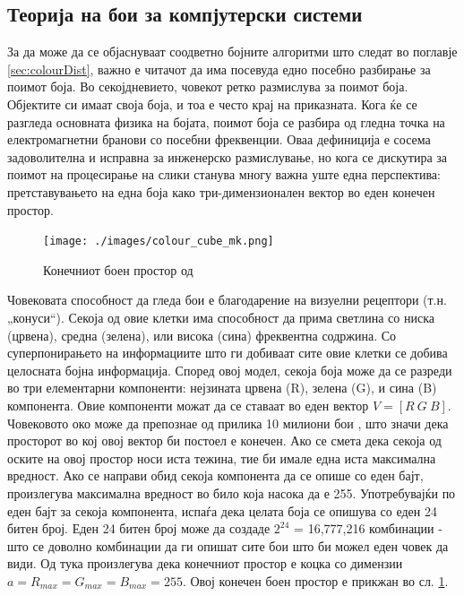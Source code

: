 \documentclass[11pt]{article}
\begin{document}
  \subsection{Теорија на бои за компјутерски системи}
    \label{sec:colour_theory}
    За да може да се објаснуваат соодветно бојните алгоритми што следат во поглавје \ref{sec:colourDist}, важно е читачот да има посевуда едно посебно разбирање за поимот боја.
    Во секојдневието, човекот ретко размислува за поимот боја. Објектите си имаат своја боја, и тоа е често крај на приказната. Кога ќе се разгледа основната физика на бојата, поимот боја се разбира од гледна точка на електромагнетни бранови со посебни фреквенции. Оваа дефиниција е сосема задоволителна и исправна за инженерско размислување, но кога се дискутира за поимот на процесирање на слики станува многу важна уште една перспектива: претставувањето на една боја како три-димензионален вектор во еден конечен простор.
    \\

    \begin{figure}[h]
      \centering
      \texttt{[image: ./images/colour\_cube\_mk.png]}
      \caption{Конечниот боен простор од \cite{colourcube}}
      \label{fig:colour_cube}

      \end{figure}
    Човековата способност да гледа бои е благодарение на визуелни рецептори (т.н. „конуси“). Секоја од овие клетки има способност да прима светлина со ниска (црвена), средна (зелена), или висока (сина) фреквентна содржина. Со суперпонирањето на информациите што ги добиваат сите овие клетки се добива целосната бојна информација. Според овој модел, секоја боја може да се разреди во три елементарни компоненти: нејзината црвена (R), зелена (G), и сина (B) компонента. Овие компоненти можат да се ставаат во еден вектор $ V = [R\ G\ B]$. Човековото око може да препознае од прилика 10 милиони бои \cite{nColours}, што значи дека просторот во кој овој вектор би постоел е конечен. Ако се смета дека секоја од оските на овој простор носи иста тежина, тие би имале една иста максимална вредност. Ако се направи обид секоја компонента да се опише со еден бајт, произлегува максимална вредност во било која насока да е 255. Употребувајќи по еден бајт за секоја компонента, испаѓа дека целата боја се опишува со еден 24 битен број. Еден 24 битен број може да создаде $2^{24}$ = 16,777,216 комбинации - што се доволно комбинации да ги опишат сите бои што би можел еден човек да види. Од тука произлегува дека конечниот простор е коцка со димензии $a = R_{max} = G_{max} = B_{max} = 255 $.
    Овој конечен боен простор е прикжан во сл. \ref{fig:colour_cube}.
    \bigbreak
\end{document}
